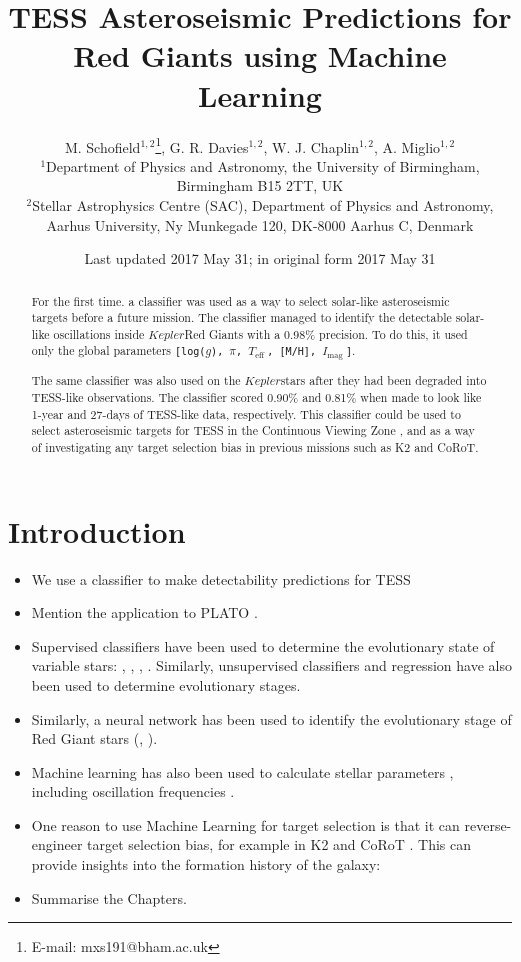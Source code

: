 \documentclass[a4paper,fleqn,usenatbib,useAMS]{mnras}
\title[Asteroseismology with Machine Learning]{TESS Asteroseismic Predictions for Red Giants using Machine Learning}
\author[M. Schofield et al.]{M. Schofield$^{1, 2}$\thanks{E-mail: mxs191@bham.ac.uk}, G. R. Davies$^{1, 2}$, W. J. Chaplin$^{1, 2}$, A. Miglio$^{1, 2}$
\\
$^{1}$Department of Physics and Astronomy, the University of Birmingham, Birmingham B15 2TT, UK \\
$^{2}$Stellar Astrophysics Centre (SAC), Department of Physics and Astronomy, Aarhus University, Ny Munkegade 120, DK-8000 Aarhus C, Denmark}
\date{Last updated 2017 May 31; in original form 2017 May 31}
\newcommand{\teff}{\ensuremath{T_{\textrm{eff}}\:}}
\newcommand{\kep}{\ensuremath{Kepler}\:}
\newcommand{\imag}{\ensuremath{I_{\textrm{mag}}\:}}
\begin{document}
\label{firstpage}
\pagerange{\pageref{firstpage}--\pageref{lastpage}}
\maketitle

\begin{abstract}
For the first time. a classifier was used as a way to select solar-like asteroseismic targets before a future mission. The classifier managed to identify the detectable solar-like oscillations inside \kep Red Giants with a 0.98\% precision. To do this, it used only the global parameters \texttt{[log($g$), $\pi$, \teff, [M/H], \imag]}.

The same classifier was also used on the \kep stars after they had been degraded into TESS-like observations. The classifier scored 0.90\% and 0.81\% when made to look like 1-year and 27-days of TESS-like data, respectively. This classifier could be used to select asteroseismic targets for TESS in the Continuous Viewing Zone \citep{ricker_transiting_2014}, and as a way of investigating any target selection bias in previous missions such as K2 and CoRoT.
\end{abstract}



\section{Introduction}

\begin{itemize}
\item We use a classifier to make detectability predictions for TESS \citep{ricker_transiting_2014}
\item Mention the application to PLATO \citep{rauer_plato_2014}.
\item Supervised classifiers have been used to determine the evolutionary state of variable stars: \citet{debosscher_automated_2007}, \citet{sarro_automated_2009}, \citet{nun_supervised_2014}, \citet{elorrieta_machine_2016}. Similarly, unsupervised classifiers \citep{valenzuela_unsupervised_2018} and regression \citep{ness_cannon_2015} have also been used to determine evolutionary stages.
\item Similarly, a neural network has been used to identify the evolutionary stage of Red Giant stars (\citet{hon_deep_2017}, \citet{hon_deep_2018}).
\item Machine learning has also been used to calculate stellar parameters \citep{bellinger_fundamental_2016}, including oscillation frequencies \citep{davies_oscillation_2016}.
\item One reason to use Machine Learning for target selection is that it can reverse-engineer target selection bias, for example in K2 \citep{lund_K2P2_2015} and CoRoT \citep{baglin_corot:_2006}. This can provide insights into the formation history of the galaxy: \citet{thomas_galactic_2017}
\item Summarise the Chapters.
\end{itemize}
\end{document}
